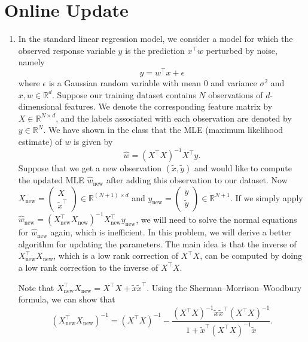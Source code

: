 \documentclass[a3paper,12pt]{extarticle} %
\begin{document}
\section{Online Update}
    \begin{enumerate}
        \item In the standard linear regression model, we consider a model for which the observed response variable \( y \) is the prediction \( x^\top w \) perturbed by noise, namely
        \[
        y = w^\top x + \epsilon
        \]
        where \( \epsilon \) is a Gaussian random variable with mean 0 and variance \( \sigma^2 \) and \( x, w \in \mathbb{R}^d \). Suppose our training dataset contains \( N \) observations of \( d \)-dimensional features. We denote the corresponding feature matrix by \( X \in \mathbb{R}^{N \times d} \), and the labels associated with each observation are denoted by \( y \in \mathbb{R}^N \). We have shown in the class that the MLE (maximum likelihood estimate) of \( w \) is given by
        \[
        \hat{w} = (X^\top X)^{-1} X^\top y.
        \]
        Suppose that we get a new observation \( (\tilde{x}, \tilde{y}) \) and would like to compute the updated MLE \( \hat{w}_{\text{new}} \) after adding this observation to our dataset. Now \( X_{\text{new}} = \begin{pmatrix} X \\ \tilde{x}^\top \end{pmatrix} \in \mathbb{R}^{(N+1) \times d} \) and \( y_{\text{new}} = \begin{pmatrix} y \\ \tilde{y} \end{pmatrix} \in \mathbb{R}^{N+1} \). If we simply apply \( \hat{w}_{\text{new}} = (X_{\text{new}}^\top X_{\text{new}})^{-1} X_{\text{new}}^\top y_{\text{new}} \), we will need to solve the normal equations for \( \hat{w}_{\text{new}} \) again, which is inefficient. In this problem, we will derive a better algorithm for updating the parameters. The main idea is that the inverse of \( X_{\text{new}}^\top X_{\text{new}} \), which is a low rank correction of \( X^\top X \), can be computed by doing a low rank correction to the inverse of \( X^\top X \).

        Note that \( X_{\text{new}}^\top X_{\text{new}} = X^\top X + \tilde{x} \tilde{x}^\top \). Using the Sherman–Morrison–Woodbury formula, we can show that
        \[
        (X_{\text{new}}^\top X_{\text{new}})^{-1} = (X^\top X)^{-1} - \frac{(X^\top X)^{-1} \tilde{x} \tilde{x}^\top (X^\top X)^{-1}}{1 + \tilde{x}^\top (X^\top X)^{-1} \tilde{x}}.
        \]


\end{enumerate}
\end{document}
